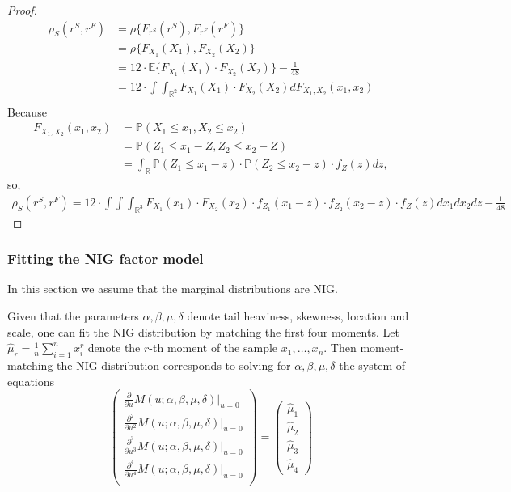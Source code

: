 \begin{proof}
  \begin{align}
  \rho_S(r^S, r^F) &= \rho\{F_{r^S}(r^S), F_{r^F}(r^F)\} \\
    &= \rho\{F_{X_1}(X_1), F_{X_2}(X_2)\} \\
    &= 12 \cdot \mathbb{E}\{F_{X_1}(X_1) \cdot F_{X_2}(X_2) \} - \frac{1}{48}\\
    &= 12 \cdot \int \int_{\mathbb{R}^2} F_{X_1}(X_1) \cdot F_{X_2}(X_2) dF_{X_1,X_2}(x_1,x_2)\\
    \end{align}
  Because
  \begin{align}
    F_{X_1,X_2}(x_1,x_2) &= \mathbb{P}(X_1 \leq x_1, X_2 \leq x_2)\\
    &= \mathbb{P}(Z_1 \leq x_1 - Z, Z_2 \leq x_2 - Z) \\
    &= \int_\mathbb{R}\mathbb{P}(Z_1 \leq x_1 - z) \cdot \mathbb{P}(Z_2 \leq x_2 - z) \cdot f_Z(z) dz,
    \end{align}
  so,
  \begin{align}
    \rho_S(r^S, r^F) = 12 \cdot \int \int \int_{\mathbb{R}^3} F_{X_1}(x_1) \cdot F_{X_2}(x_2) \cdot f_{Z_1}(x_1 -z) \cdot f_{Z_2}(x_2 -z) \cdot f_{Z}(z) dx_1 dx_2 dz -\frac{1}{48}
    \end{align}
  \end{proof}

\subsubsection{Fitting the NIG factor model}
\label{sec:fitt-nig-distr}

In this section we assume that the marginal distributions are NIG. 

Given that the parameters $\alpha, \beta, \mu, \delta$ denote tail
heaviness, skewness, location and scale, one can fit the NIG
distribution by matching the first four moments. Let
$\hat\mu_r=\frac{1}{n} \sum_{i=1}^n x_i^r$ denote the $r$-th moment of
the sample $x_1, \ldots, x_n$. Then moment-matching the NIG
distribution corresponds to solving for $\alpha, \beta, \mu, \delta$
the system of equations
\begin{equation*}
  \begin{pmatrix}
    \frac{\partial}{\partial u} M(u; \alpha, \beta, \mu,
    \delta)|_{u=0}\\[5pt]
    \frac{\partial^2}{\partial u^2} M(u; \alpha, \beta, \mu,
    \delta)|_{u=0}\\[5pt]
    \frac{\partial^3}{\partial u^3} M(u; \alpha, \beta, \mu,
    \delta)|_{u=0}\\[5pt]
    \frac{\partial^4}{\partial u^4} M(u; \alpha, \beta, \mu,
    \delta)|_{u=0}\\
  \end{pmatrix}
  =
  \begin{pmatrix}
    \hat\mu_1\\[5pt]
    \hat\mu_2\\[5pt]
    \hat\mu_3\\[5pt]
    \hat\mu_4
  \end{pmatrix}
\end{equation*}


